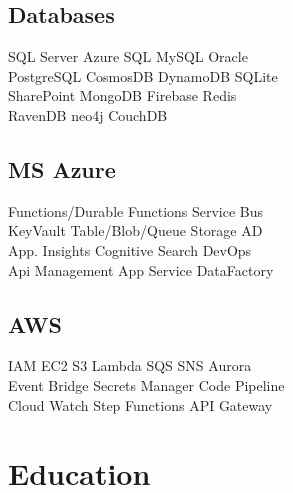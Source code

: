 \documentclass[letterpaper]{cv_12} %
\begin{document}
\begin{newpage}
\begin{minipage}[t]{0.39\textwidth}
    \sectionspace%

    \subsection{Databases}

    SQL Server \textbullet{} Azure SQL \textbullet{} MySQL \textbullet{}
    Oracle\\
    PostgreSQL \textbullet{} CosmosDB \textbullet{} DynamoDB \textbullet{}
    SQLite\\
    SharePoint \textbullet{} MongoDB \textbullet{} Firebase \textbullet{} 
    Redis\\
    RavenDB \textbullet{} neo4j \textbullet{} CouchDB

    \sectionspace%

    \subsection{MS Azure}

    Functions/Durable Functions \textbullet{} Service Bus\\
    KeyVault \textbullet{} Table/Blob/Queue Storage \textbullet{} AD\\
    App. Insights \textbullet{} Cognitive Search \textbullet{} DevOps\\
    Api Management \textbullet{} App Service \textbullet{} DataFactory

    \sectionspace%

    \subsection{AWS}

    IAM \textbullet{} EC2 \textbullet{} S3 \textbullet{} Lambda
    \textbullet{} SQS \textbullet{} SNS \textbullet{} Aurora\\
    Event Bridge \textbullet{} Secrets Manager \textbullet{} Code
    Pipeline\\
    Cloud Watch \textbullet{} Step Functions \textbullet{} API Gateway

    \sectionspace%


    \section{Education}


\end{minipage}
\end{newpage}
\end{document}
